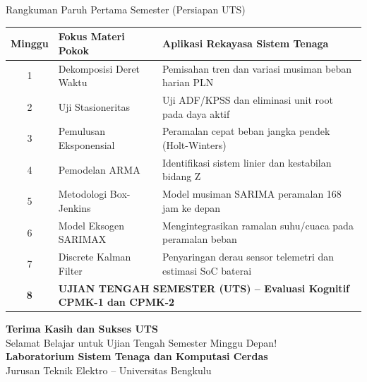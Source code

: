 \documentclass[aspectratio=169, 10pt]{beamer}
\begin{document}
\begin{frame}{Rangkuman Paruh Pertama Semester (Persiapan UTS)}
    \begin{table}[h!]
    \centering
    \scriptsize
    \renewcommand{\arraystretch}{1.1}
    \begin{tabular}{|c|l|l|}
    \hline
    \rowcolor{tableheader}
    \color{white}\textbf{Minggu} & \color{white}\textbf{Fokus Materi Pokok} & \color{white}\textbf{Aplikasi Rekayasa Sistem Tenaga} \\ \hline
    1 & Dekomposisi Deret Waktu & Pemisahan tren dan variasi musiman beban harian PLN \\ \hline
    2 & Uji Stasioneritas & Uji ADF/KPSS dan eliminasi unit root pada daya aktif \\ \hline
    3 & Pemulusan Eksponensial & Peramalan cepat beban jangka pendek (Holt-Winters) \\ \hline
    4 & Pemodelan ARMA & Identifikasi sistem linier dan kestabilan bidang Z \\ \hline
    5 & Metodologi Box-Jenkins & Model musiman SARIMA peramalan 168 jam ke depan \\ \hline
    6 & Model Eksogen SARIMAX & Mengintegrasikan ramalan suhu/cuaca pada peramalan beban \\ \hline
    7 & Discrete Kalman Filter & Penyaringan derau sensor telemetri dan estimasi SoC baterai \\ \hline
    \rowcolor{lightbg}
    \textbf{8} & \multicolumn{2}{l|}{\textbf{UJIAN TENGAH SEMESTER (UTS) -- Evaluasi Kognitif CPMK-1 dan CPMK-2}} \\ \hline
    \end{tabular}
    \end{table}
\end{frame}

\begin{frame}[plain]
    \begin{center}
        \vspace{1.5cm}
        {\Huge \color{mainblue} \textbf{Terima Kasih dan Sukses UTS}}\\[0.4cm]
        {\large Selamat Belajar untuk Ujian Tengah Semester Minggu Depan!}\\[1.2cm]
        \textbf{Laboratorium Sistem Tenaga dan Komputasi Cerdas}\\
        Jurusan Teknik Elektro -- Universitas Bengkulu
    \end{center}
\end{frame}
\end{document}
